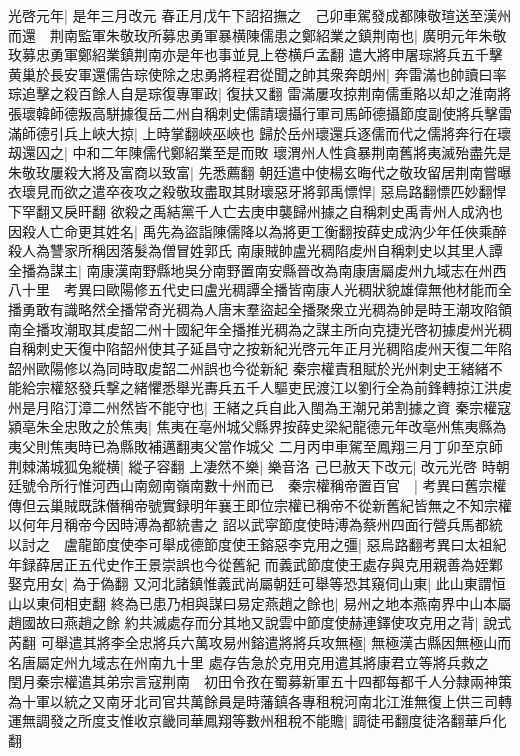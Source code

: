 光啓元年|{
	是年三月改元}
春正月戊午下詔招撫之　己卯車駕發成都陳敬瑄送至漢州而還　荆南監軍朱敬玫所募忠勇軍暴横陳儒患之鄭紹業之鎮荆南也|{
	廣明元年朱敬玫募忠勇軍鄭紹業鎮荆南亦是年也事並見上卷横戶孟翻}
遣大將申屠琮將兵五千擊黄巢於長安軍還儒告琮使除之忠勇將程君從聞之帥其衆奔朗州|{
	奔雷滿也帥讀曰率}
琮追擊之殺百餘人自是琮復專軍政|{
	復扶又翻}
雷滿屢攻掠荆南儒重賂以却之淮南將張瓌韓師德叛高駢據復岳二州自稱刺史儒請瓌攝行軍司馬師德攝節度副使將兵擊雷滿師德引兵上峽大掠|{
	上時掌翻峽巫峽也}
歸於岳州瓌還兵逐儒而代之儒將奔行在瓌刼還囚之|{
	中和二年陳儒代鄭紹業至是而敗}
瓌渭州人性貪暴荆南舊將夷滅殆盡先是朱敬玫屢殺大將及富商以致富|{
	先悉薦翻}
朝廷遣中使楊玄晦代之敬玫留居荆南嘗曝衣瓌見而欲之遣卒夜攻之殺敬玫盡取其財瓌惡牙將郭禹慓悍|{
	惡烏路翻慓匹妙翻悍下罕翻又戾旰翻}
欲殺之禹結黨千人亡去庚申襲歸州據之自稱刺史禹青州人成汭也因殺人亡命更其姓名|{
	禹先為盜詣陳儒降以為將更工衡翻按薛史成汭少年任俠乘醉殺人為讐家所稱因落髮為僧冒姓郭氏}
南康賊帥盧光稠陷䖍州自稱刺史以其里人譚全播為謀主|{
	南康漢南野縣地吳分南野置南安縣晉改為南康唐屬䖍州九域志在州西八十里　考異曰歐陽修五代史曰盧光稠譚全播皆南康人光稠狀貌雄偉無他材能而全播勇敢有識略然全播常奇光稠為人唐末羣盜起全播聚衆立光稠為帥是時王潮攻陷領南全播攻潮取其䖍韶二州十國紀年全播推光稠為之謀主所向克捷光啓初據䖍州光稠自稱刺史天復中陷韶州使其子延昌守之按新紀光啓元年正月光稠陷䖍州天復二年陷韶州歐陽修以為同時取䖍韶二州誤也今從新紀}
秦宗權責租賦於光州刺史王緒緒不能給宗權怒發兵撃之緒懼悉舉光夀兵五千人驅吏民渡江以劉行全為前鋒轉掠江洪䖍州是月陷汀漳二州然皆不能守也|{
	王緒之兵自此入閩為王潮兄弟割據之資}
秦宗權寇潁亳朱全忠敗之於焦夷|{
	焦夷在亳州城父縣界按薛史梁紀龍德元年改亳州焦夷縣為夷父則焦夷時已為縣敗補邁翻夷父當作城父}
二月丙申車駕至鳳翔三月丁卯至京師荆棘滿城狐兔縱横|{
	縱子容翻}
上凄然不樂|{
	樂音洛}
己巳赦天下改元|{
	改元光啓}
時朝廷號令所行惟河西山南劒南嶺南數十州而已　秦宗權稱帝置百官　|{
	考異曰舊宗權傳但云巢賊既誅僭稱帝號實録明年襄王即位宗權已稱帝不從新舊紀皆無之不知宗權以何年月稱帝今因時溥為都統書之}
詔以武寜節度使時溥為蔡州四面行營兵馬都統以討之　盧龍節度使李可舉成德節度使王鎔惡李克用之彊|{
	惡烏路翻考異曰太祖紀年録薛居正五代史作王景崇誤也今從舊紀}
而義武節度使王處存與克用親善為姪鄴娶克用女|{
	為于偽翻}
又河北諸鎮惟義武尚屬朝廷可舉等恐其窺伺山東|{
	此山東謂恒山以東伺相吏翻}
終為已患乃相與謀曰易定燕趙之餘也|{
	易州之地本燕南界中山本屬趙國故曰燕趙之餘}
約共滅處存而分其地又說雲中節度使赫連鐸使攻克用之背|{
	說式芮翻}
可舉遣其將李全忠將兵六萬攻易州鎔遣將將兵攻無極|{
	無極漢古縣因無極山而名唐屬定州九域志在州南九十里}
處存告急於克用克用遣其將康君立等將兵救之　閏月秦宗權遣其弟宗言寇荆南　初田令孜在蜀募新軍五十四都每都千人分隸兩神策為十軍以統之又南牙北司官共萬餘員是時藩鎮各專租稅河南北江淮無復上供三司轉運無調發之所度支惟收京畿同華鳳翔等數州租稅不能贍|{
	調徒弔翻度徒洛翻華戶化翻}
